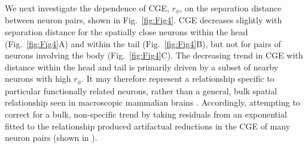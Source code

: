 \documentclass[10pt,letterpaper]{article}
\begin{document}
We next investigate the dependence of CGE, $r_\phi$, on the separation distance between neuron pairs, shown in Fig.~\ref{fig:Fig4}.
CGE decreases slightly with separation distance for the spatially close neurons within the head (Fig.~\ref{fig:Fig4}A) and within the tail (Fig.~\ref{fig:Fig4}B), but not for pairs of neurons involving the body (Fig.~\ref{fig:Fig4}C).
The decreasing trend in CGE with distance within the head and tail is primarily driven by a subset of nearby neurons with high $r_\phi$.
It may therefore represent a relationship specific to particular functionally related neurons, rather than a general, bulk spatial relationship seen in macroscopic mammalian brains \cite{Fulcher:2016ck}.
Accordingly, attempting to correct for a bulk, non-specific trend by taking residuals from an exponential fitted to the relationship produced artifactual reductions in the CGE of many neuron pairs (shown in ).
\end{document}
